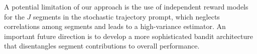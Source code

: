 \documentclass{article}
\begin{document}
A potential limitation of our approach is the use of independent reward models for the $J$ segments in the stochastic trajectory prompt, which neglects correlations among segments and leads to a high-variance estimator. An important future direction is to develop a more sophisticated bandit architecture that disentangles segment contributions to overall performance.


\end{document}
